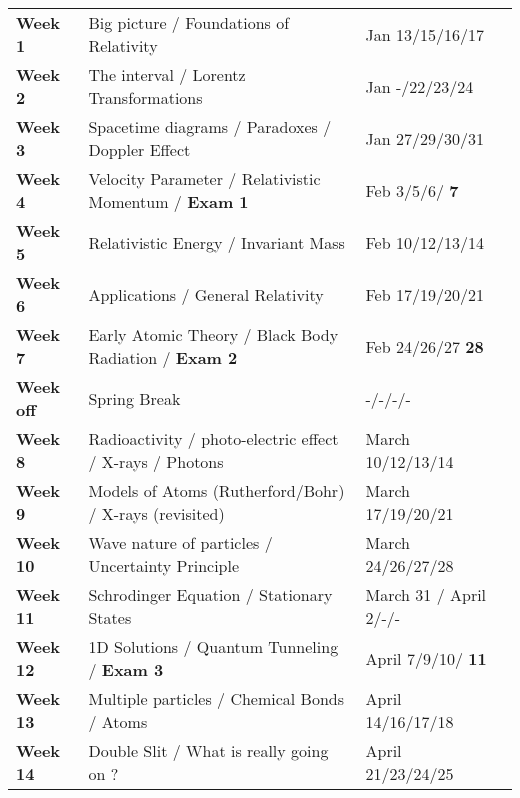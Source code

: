 \documentclass[margin,line]{res}
\newcommand\inRed[1]{{\color{red}  \textbf{#1}}}
\begin{document}
\begin{resume}
\begin{tabular}{llll}
\textbf{Week 1}   & Big picture / Foundations of Relativity        & Jan 13/15/16/17 & \\
\textbf{Week 2}   & The interval / Lorentz Transformations         & Jan -/22/23/24 & \\
\textbf{Week 3}   & Spacetime diagrams / Paradoxes / Doppler Effect        & Jan 27/29/30/31 & \\
\textbf{Week 4}   & Velocity Parameter / Relativistic Momentum / \inRed{Exam 1}    & Feb 3/5/6/\inRed{7} & \\
\textbf{Week 5}   & Relativistic Energy / Invariant Mass                  & Feb 10/12/13/14 & \\
\textbf{Week 6}   & Applications / General Relativity                     & Feb 17/19/20/21 & \\
\textbf{Week 7}   & Early Atomic Theory / Black Body Radiation / \inRed{Exam 2}       & Feb 24/26/27 \inRed{28} & \\
\textbf{Week off} &  Spring Break                              & -/-/-/- & \\
\textbf{Week 8}   & Radioactivity / photo-electric effect / X-rays / Photons   & March 10/12/13/14 & \\
\textbf{Week 9}   &  Models of Atoms (Rutherford/Bohr) / X-rays (revisited)      & March 17/19/20/21 & \\
\textbf{Week 10}  &  Wave nature of particles / Uncertainty Principle                                     & March 24/26/27/28 & \\
\textbf{Week 11}  &  Schrodinger Equation / Stationary States               & March 31 / April 2/-/- & \\
\textbf{Week 12}  &  1D Solutions / Quantum Tunneling / \inRed{Exam 3}           & April 7/9/10/\inRed{11} & \\
\textbf{Week 13}  &  Multiple particles / Chemical Bonds / Atoms                     & April 14/16/17/18 & \\
\textbf{Week 14}  &  Double Slit / What is really going on ?                         & April 21/23/24/25 & \\
\end{tabular}

\end{resume}
\end{document}
